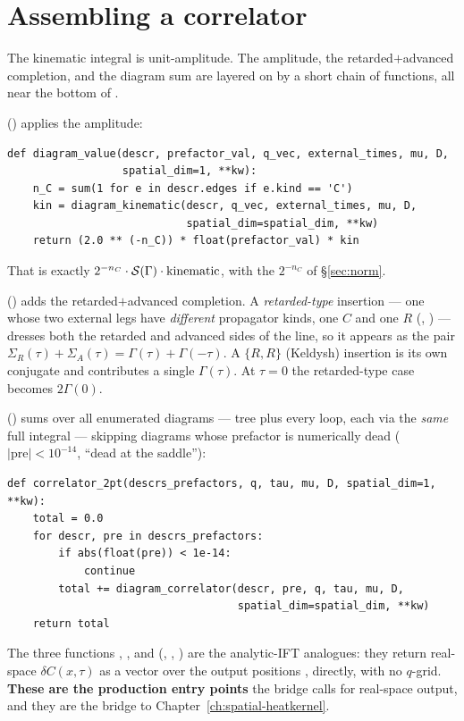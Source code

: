 \section{Assembling a correlator}

The kinematic integral is unit-amplitude. The amplitude, the retarded$+$advanced
completion, and the diagram sum are layered on by a short chain of functions, all
near the bottom of .

 () applies the amplitude:
\begin{lstlisting}
def diagram_value(descr, prefactor_val, q_vec, external_times, mu, D,
                  spatial_dim=1, **kw):
    n_C = sum(1 for e in descr.edges if e.kind == 'C')
    kin = diagram_kinematic(descr, q_vec, external_times, mu, D,
                            spatial_dim=spatial_dim, **kw)
    return (2.0 ** (-n_C)) * float(prefactor_val) * kin
\end{lstlisting}
That is exactly $2^{-n_C}\cdot\mathcal{S}(\Gamma)\cdot\text{kinematic}$, with the
$2^{-n_C}$ of \S\ref{sec:norm}.

 () adds the
retarded$+$advanced completion. A \emph{retarded-type} insertion --- one whose two
external legs have \emph{different} propagator kinds, one $C$ and one $R$
(, ) --- dresses both the
retarded and advanced sides of the line, so it appears as the pair
$\Sigma_R(\tau)+\Sigma_A(\tau) = \Gamma(\tau)+\Gamma(-\tau)$. A $\{R,R\}$ (Keldysh)
insertion is its own conjugate and contributes a single $\Gamma(\tau)$. At
$\tau=0$ the retarded-type case becomes $2\Gamma(0)$.

 () sums over all enumerated
diagrams --- tree plus every loop, each via the \emph{same} full integral ---
skipping diagrams whose prefactor is numerically dead
($|\text{pre}| < 10^{-14}$, ``dead at the saddle''):
\begin{lstlisting}
def correlator_2pt(descrs_prefactors, q, tau, mu, D, spatial_dim=1, **kw):
    total = 0.0
    for descr, pre in descrs_prefactors:
        if abs(float(pre)) < 1e-14:
            continue
        total += diagram_correlator(descr, pre, q, tau, mu, D,
                                    spatial_dim=spatial_dim, **kw)
    return total
\end{lstlisting}

The three functions , , and
 (,
, ) are the
analytic-IFT analogues: they return real-space $\delta C(x,\tau)$ as a vector over
the output positions , directly, with no $q$-grid. \textbf{These are the
production entry points} the bridge calls for real-space output, and they are the
bridge to Chapter~\ref{ch:spatial-heatkernel}.

